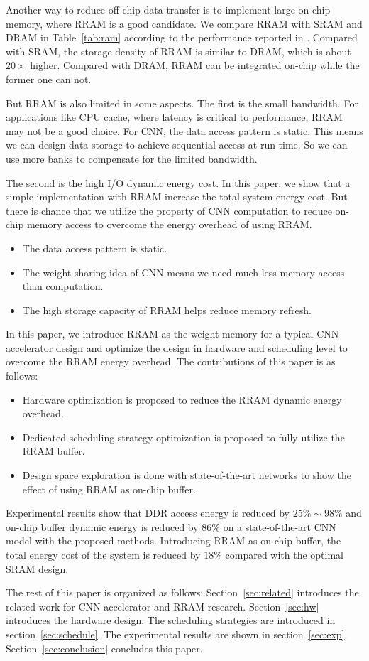 Another way to reduce off-chip data transfer is to implement large on-chip memory, where RRAM is a good candidate. We compare RRAM with SRAM and DRAM in Table~\ref{tab:ram} according to the performance reported in \cite{ee598, fackenthal201419, dong2014nvsim}. Compared with SRAM, the storage density of RRAM is similar to DRAM, which is about $20\times$ higher. Compared with DRAM, RRAM can be integrated on-chip while the former one can not.



But RRAM is also limited in some aspects. The first is the small bandwidth. For applications like CPU cache, where latency is critical to performance, RRAM may not be a good choice. For CNN, the data access pattern is static. This means we can design data storage to achieve sequential access at run-time. So we can use more banks to compensate for the limited bandwidth.

The second is the high I/O dynamic energy cost. In this paper, we show that a simple implementation with RRAM increase the total system energy cost. But there is chance that we utilize the property of CNN computation to reduce on-chip memory access to overcome the energy overhead of using RRAM. 

\begin{itemize}
\item {The data access pattern is static. }
\item {The weight sharing idea of CNN means we need much less memory access than computation.}
\item {The high storage capacity of RRAM helps reduce memory refresh.}
\end{itemize}

In this paper, we introduce RRAM as the weight memory for a typical CNN accelerator design and optimize the design in hardware and scheduling level to overcome the RRAM energy overhead. The contributions of this paper is as follows:
\begin{itemize}
\item {Hardware optimization is proposed to reduce the RRAM dynamic energy overhead.}
\item {Dedicated scheduling strategy optimization is proposed to fully utilize the RRAM buffer.}
\item {Design space exploration is done with state-of-the-art networks to show the effect of using RRAM as on-chip buffer.}
\end{itemize}
Experimental results show that DDR access energy is reduced by $25\%\sim 98\%$ and on-chip buffer dynamic energy is reduced by $86\%$ on a state-of-the-art CNN model with the proposed methods. Introducing RRAM as on-chip buffer, the total energy cost of the system is reduced by $18\%$ compared with the optimal SRAM design.

The rest of this paper is organized as follows: Section~\ref{sec:related} introduces the related work for CNN accelerator and RRAM research. Section~\ref{sec:hw} introduces the hardware design. The scheduling strategies are introduced in section~\ref{sec:schedule}. The experimental results are shown in section~\ref{sec:exp}. Section~\ref{sec:conclusion} concludes this paper.